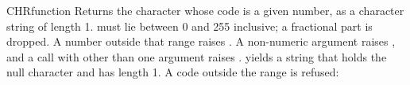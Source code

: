\begin{XbaseEntry}{CHR}{function}
Returns the character whose code is a given number, as a character string of length 1.
\Syntax
{}
\Usage
{} must lie between 0 and 255 inclusive; a fractional part is dropped. A number outside that range raises . A non-numeric argument raises , and a call with other than one argument raises .  yields a string that holds the null character and has length 1.
\Examples
{}
A code outside the range is refused:
\end{XbaseEntry}

